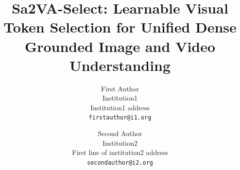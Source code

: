 \documentclass[10pt,twocolumn,letterpaper]{article}
\title{Sa2VA-Select: Learnable Visual Token Selection for Unified Dense Grounded Image and Video Understanding}
\author{First Author\\
Institution1\\
Institution1 address\\
{\tt\small firstauthor@i1.org}
\and
Second Author\\
Institution2\\
First line of institution2 address\\
{\tt\small secondauthor@i2.org}
}
\begin{document}
\maketitle
    





{
    \small
    
    
}

% 
\end{document}

